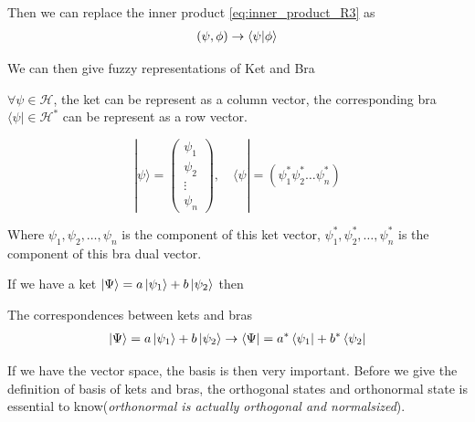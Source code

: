 Then we can replace the inner product \cref{eq:inner_product_R3} as 
\begin{eqnarray}
    \left(\psi,\phi\right) \rightarrow \braket{\psi|\phi}
\end{eqnarray}

We can then give fuzzy representations of Ket and Bra
\begin{lemma} \label{lemma:ketbra_as_matrix}
    $\forall \psi \in \mathcal{H}$, the ket can be represent as a column vector, the corresponding bra $\langle\psi| \in \mathcal{H}^*$ can be represent as a row vector.

$$
|\psi\rangle=\left(\begin{array}{c}
\psi_1 \\
\psi_2 \\
\vdots \\
\psi_n
\end{array}\right), \quad\langle\psi|=\left(\psi_1^* \psi_2^* \ldots \psi_n^*\right)
$$


Where $\psi_1, \psi_2, \ldots, \psi_n$ is the component of this ket vector, $\psi_1^*, \psi_2^*, \ldots, \psi_n^*$ is the component of this bra dual vector.
\end{lemma}
If we have a ket $\ket{\Psi} = a \ket{\psi_1}+b\ket{\psi_2}$ then 
\begin{tcolorbox}
    The correspondences between kets and bras 
    \begin{eqnarray}
        \ket{\Psi} = a \ket{\psi_1}+b\ket{\psi_2} \rightarrow \bra{\Psi} = a^* \bra{\psi_1}+ b^* \bra{\psi_2}
    \end{eqnarray}
\end{tcolorbox}
If we have the vector space, the basis is then very important. Before we give the definition of basis of kets and bras, the orthogonal states and orthonormal state is essential to know(\emph{orthonormal is actually orthogonal and normalsized}).

